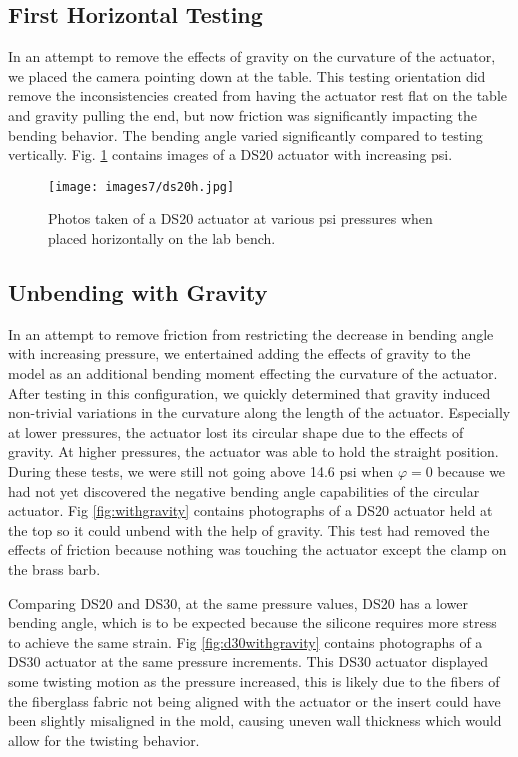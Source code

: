 \subsection{First Horizontal Testing}

In an attempt to remove the effects of gravity on the curvature of the actuator, we placed the camera pointing down at the table. This testing orientation did remove the inconsistencies created from having the actuator rest flat on the table and gravity pulling the end, but now friction was significantly impacting the bending behavior. The bending angle varied significantly compared to testing vertically. Fig. \ref{fig:ds20h} contains images of a DS20 actuator with increasing psi. 

\begin{figure}[h]
    \centering
     \texttt{[image: images7/ds20h.jpg]}
    \caption{Photos taken of a DS20 actuator at various psi pressures when placed horizontally on the lab bench.}
    \label{fig:ds20h}
\end{figure}

\subsection{Unbending with Gravity}

In an attempt to remove friction from restricting the decrease in bending angle with increasing pressure, we entertained adding the effects of gravity to the model as an additional bending moment effecting the curvature of the actuator. After testing in this configuration, we quickly determined that gravity induced non-trivial variations in the curvature along the length of the actuator. Especially at lower pressures, the actuator lost its circular shape due to the effects of gravity. At higher pressures, the actuator was able to hold the straight position. During these tests, we were still not going above 14.6 psi when $\varphi=0$ because we had not yet discovered the negative bending angle capabilities of the circular actuator. Fig \ref{fig:withgravity} contains photographs of a DS20 actuator held at the top so it could unbend with the help of gravity. This test had removed the effects of friction because nothing was touching the actuator except the clamp on the brass barb. 

Comparing DS20 and DS30, at the same pressure values, DS20 has a lower bending angle, which is to be expected because the silicone requires more stress to achieve the same strain. Fig \ref{fig:d30withgravity} contains photographs of a DS30 actuator at the same pressure increments. This DS30 actuator displayed some twisting motion as the pressure increased, this is likely due to the fibers of the fiberglass fabric not being aligned with the actuator or the insert could have been slightly misaligned in the mold, causing uneven wall thickness which would allow for the twisting behavior. 

